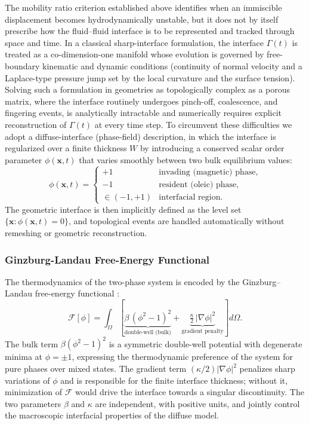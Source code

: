 The mobility ratio criterion established above identifies when an immiscible displacement becomes hydrodynamically unstable, but it does not by itself prescribe how the fluid--fluid interface is to be represented and tracked through space and time.
In a classical sharp-interface formulation, the interface $\Gamma(t)$ is treated as a co-dimension-one manifold whose evolution is governed by free-boundary kinematic and dynamic conditions (continuity of normal velocity and a Laplace-type pressure jump set by the local curvature and the surface tension).
Solving such a formulation in geometries as topologically complex as a porous matrix, where the interface routinely undergoes pinch-off, coalescence, and fingering events, is analytically intractable and numerically requires explicit reconstruction of $\Gamma(t)$ at every time step.
To circumvent these difficulties we adopt a diffuse-interface (phase-field) description, in which the interface is regularized over a finite thickness $W$ by introducing a conserved scalar order parameter $\phi(\mathbf{x}, t)$ that varies smoothly between two bulk equilibrium values:
\begin{equation}
    \phi(\mathbf{x}, t) = \begin{cases}
        +1 & \text{invading (magnetic) phase}, \\
        -1 & \text{resident (oleic) phase}, \\
        \in (-1, +1) & \text{interfacial region}.
    \end{cases}
\end{equation}
The geometric interface is then implicitly defined as the level set $\{\mathbf{x} : \phi(\mathbf{x}, t) = 0\}$, and topological events are handled automatically without remeshing or geometric reconstruction.

\subsubsection{Ginzburg-Landau Free-Energy Functional}

The thermodynamics of the two-phase system is encoded by the Ginzburg--Landau free-energy functional \cite{cahn1958free}:
\begin{equation}
    \mathcal{F}[\phi] = \int_{\Omega} \left[ \underbrace{\beta\,(\phi^2 - 1)^2}_{\text{double-well (bulk)}} + \underbrace{\tfrac{\kappa}{2}\,|\nabla \phi|^2}_{\text{gradient penalty}} \right] d\Omega.
\end{equation}
The bulk term $\beta(\phi^2 - 1)^2$ is a symmetric double-well potential with degenerate minima at $\phi = \pm 1$, expressing the thermodynamic preference of the system for pure phases over mixed states.
The gradient term $(\kappa/2)|\nabla \phi|^2$ penalizes sharp variations of $\phi$ and is responsible for the finite interface thickness;
without it, minimization of $\mathcal{F}$ would drive the interface towards a singular discontinuity.
The two parameters $\beta$ and $\kappa$ are independent, with positive units, and jointly control the macroscopic interfacial properties of the diffuse model.

